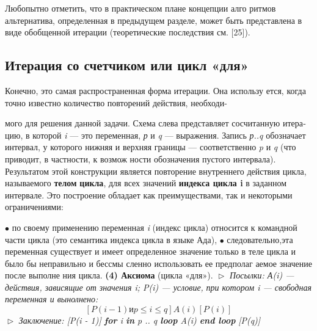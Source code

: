\parindent=1cm Любопытно отметить,  что  в  практическом  плане  концепции  алго­
ритмов альтернатива, определенная в предыдущем разделе, может быть 
представлена в виде обобщенной итерации  (теоретические  последствия 
см.  [25]).
\subsection{Итерация со счетчиком или цикл «для»}
\noindent Конечно,  это  самая  распространенная  форма  итерации.  Она использу­
ется, когда точно известно количество повторений действия, необходи-
\pagebreak
{}
									мого для решения данной задачи. Схема 
									слева представляет сосчитанную итера­
									цию, в которой \textit{i} — это переменная, \textit{р} и 
									\textit{q} — выражения. Запись \textit{р..q} обозначает 
									интервал, у которого нижняя и  верхняя
границы — соответственно \textit{p} и \textit{q} (что приводит, в частности, к возмож­
ности обозначения пустого интервала). Результатом этой конструкции 
является повторение внутреннего действия цикла, называемого \textbf{телом}
\textbf{цикла}, для всех значений \textbf{индекса цикла i} в заданном интервале. Это 
построение обладает как преимуществами, так и некоторыми ограни­чениями:

\noindent $\bullet$ по своему применению переменная \textit{i} (индекс  цикла)  относится к 
командной  части  цикла  (это  семантика  индекса  цикла  в  языке 
Ада),
\newline
$\bullet$ следовательно,эта переменная существует и имеет определенное 
значение только в теле цикла и было бы  неправильно и бессмы­
сленно использовать ее предполаг аемое значение после выполне­
ния цикла.
\newline
\textbf{(4) Аксиома} (цикла «для»).
\newline
$\vartriangleright$ \textit{Посылки: А(i) --- действия, зависящие от значения i; P(i) --- условие,}
\textit{при котором i --- свободная переменная и вынолнено:}
\begin{equation*}
\textit{$[P(i - 1) и p \leqslant i \leqslant q] A(i) [P(i)]$}
\end{equation*}
$\vartriangleright$ \textit{Заключение:  \textit{[P(i - 1)]} \textbf{for} \textit{i} \textbf{in} \textit{p .. q} \textbf{loop} \textit{A(i)} \textbf{end loop}} \textit{[P(q)]}

